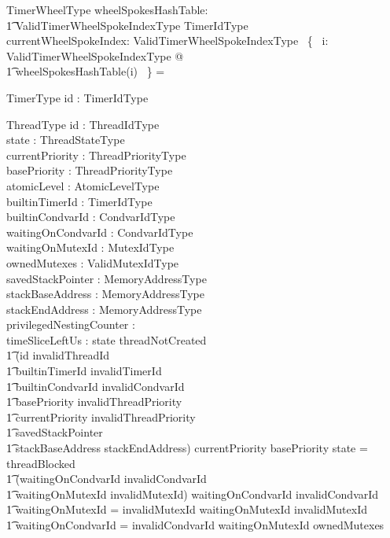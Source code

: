 \documentclass[11pt,letterpaper,twoside,openany]{book}
\begin{document}
\begin{schema}{TimerWheelType}
   wheelSpokesHashTable: \\
   \t1 ValidTimerWheelSpokeIndexType \fun \finset TimerIdType \\
   currentWheelSpokeIndex: ValidTimerWheelSpokeIndexType
\where
    \bigcap~\{~ i: ValidTimerWheelSpokeIndexType @ \\
    \t1 wheelSpokesHashTable(i) ~\} = \emptyset
\end{schema}

\begin{schema}{TimerType}
   id : TimerIdType
\end{schema}

\begin{schema}{ThreadType}
   id : ThreadIdType \\
   state : ThreadStateType \\
   currentPriority : ThreadPriorityType \\
   basePriority : ThreadPriorityType \\
   atomicLevel : AtomicLevelType \\
   builtinTimerId : TimerIdType \\
   builtinCondvarId : CondvarIdType \\
   waitingOnCondvarId : CondvarIdType \\
   waitingOnMutexId : MutexIdType \\
   ownedMutexes : \iseq ValidMutexIdType \\
   savedStackPointer : MemoryAddressType \\
   stackBaseAddress : MemoryAddressType \\
   stackEndAddress : MemoryAddressType \\
   privilegedNestingCounter : \nat \\
   timeSliceLeftUs : \nat
\where
   state \neq threadNotCreated \implies \\
   \t1 (id \neq invalidThreadId \land \\
   \t1 builtinTimerId \neq invalidTimerId \land \\
   \t1 builtinCondvarId \neq invalidCondvarId \land \\
   \t1 basePriority \neq invalidThreadPriority \land \\
   \t1 currentPriority \neq invalidThreadPriority \land \\
   \t1 savedStackPointer \in \\
   \t1 stackBaseAddress \upto stackEndAddress)
\also
   currentPriority \geq basePriority
\also
   state = threadBlocked \iff \\
   \t1 (waitingOnCondvarId \neq invalidCondvarId \lor \\
   \t1  waitingOnMutexId \neq invalidMutexId)
\also
   waitingOnCondvarId \neq invalidCondvarId \implies \\
   \t1 waitingOnMutexId = invalidMutexId
\also
   waitingOnMutexId \neq invalidMutexId \implies \\
   \t1 waitingOnCondvarId = invalidCondvarId
\also
   waitingOnMutexId \notin \ran ownedMutexes
\end{schema}
\end{document}
